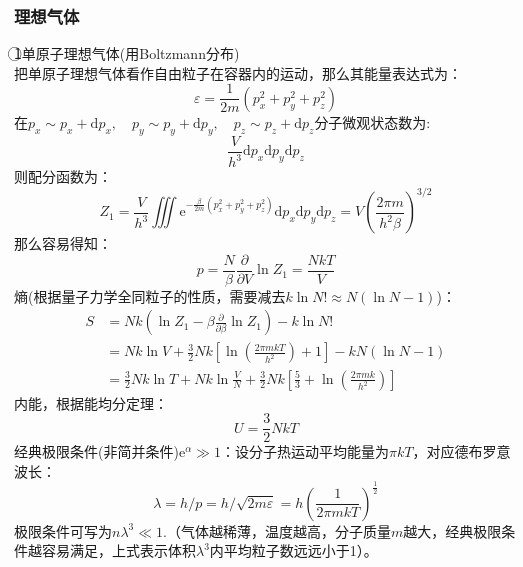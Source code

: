 \documentclass[12pt]{article}
\begin{document}
\subsubsection{理想气体}
\noindent
\textcircled{1}单原子理想气体(用Boltzmann分布)\\
把单原子理想气体看作自由粒子在容器内的运动，那么其能量表达式为：
\begin{equation}
	\varepsilon=\frac{1}{2m}(p_x^2+p_y^2+p_z^2)
\end{equation}
在$p_x\sim p_x+\mathrm{d}p_x, \quad p_y\sim p_y+\mathrm{d}p_y,\quad  p_z\sim p_z+\mathrm{d}p_z$分子微观状态数为:
\begin{equation}
	\frac{V}{h^3}\mathrm{d}p_x\mathrm{d}p_y\mathrm{d}p_z
\end{equation}
则配分函数为：
\begin{equation}
	Z_1=\frac{V}{h^3}\iiint \mathrm{e}^{-\frac{\beta}{2m}(p_x^2+p_y^2+p_z^2)}\mathrm{d}p_x\mathrm{d}p_y\mathrm{d}p_z=V(\frac{2\pi m}{h^2 \beta})^{3/2}
	\label{x41}
\end{equation}
那么容易得知：
\begin{equation}
	p=\frac{N}{\beta}\frac{\partial}{\partial V}\ln Z_1=\frac{NkT}{V}
\end{equation}
熵(根据量子力学全同粒子的性质，需要减去$k\ln N!\approx N(\ln N-1)$)：
\begin{equation}
	\begin{split}
	S&=Nk(\ln Z_1-\beta\frac{\partial}{\partial \beta}\ln Z_1)-k\ln N!\\
	&=Nk\ln V+\frac{3}{2}Nk[\ln (\frac{2\pi m k T}{h^2})+1]-kN(\ln N-1)\\
	&=\frac{3}{2}Nk\ln T+Nk\ln \frac{V}{N}+\frac{3}{2}Nk[\frac{5}{3}+\ln (\frac{2\pi m k}{h^2})]
		\end{split}
\end{equation}
内能，根据能均分定理：
\begin{equation}
	U=\frac{3}{2}NkT
\end{equation}
 经典极限条件(非简并条件)$\mathrm{e}^\alpha\gg 1$：设分子热运动平均能量为$\pi k T$，对应德布罗意波长：
 \begin{equation}
 	\lambda =h/p=h/\sqrt{2m\varepsilon}=h(\frac{1}{2\pi m k T})^{\frac{1}{2}}
 \end{equation}
极限条件可写为$n\lambda^3\ll 1$.（气体越稀薄，温度越高，分子质量$m$越大，经典极限条件越容易满足，上式表示体积$\lambda^3$内平均粒子数远远小于1）。\\
\end{document}
